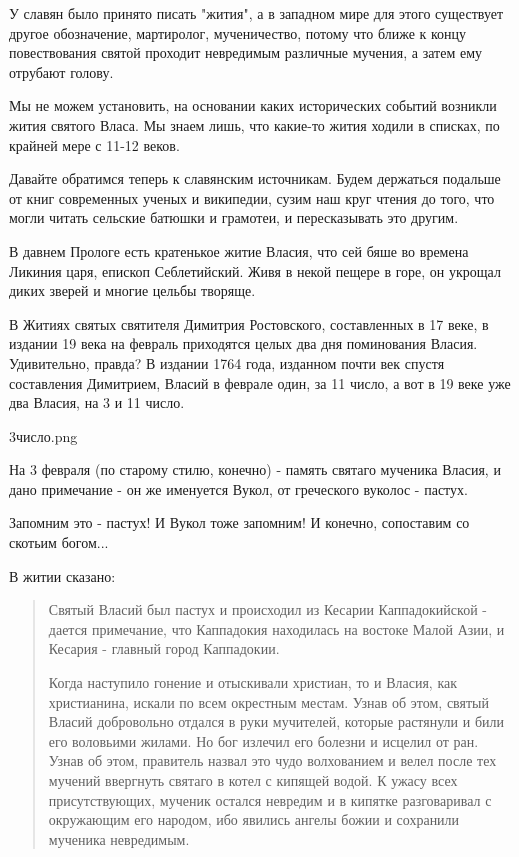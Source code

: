 \documentclass[a5paper,11pt,openany]{article}
\begin{document}
   У славян было принято писать "жития", а в западном мире для этого существует другое обозначение, мартиролог, мученичество, потому что ближе к концу повествования святой проходит невредимым различные мучения, а затем ему отрубают голову.   

    Мы не можем установить, на основании каких исторических событий возникли жития святого Власа. Мы знаем лишь, что какие-то жития ходили в списках, по крайней мере с 11-12 веков.

   Давайте обратимся теперь к славянским источникам. Будем держаться подальше от книг современных ученых и википедии, сузим наш круг чтения до того, что могли читать сельские батюшки и грамотеи, и пересказывать это другим.

   В давнем Прологе есть кратенькое житие Власия, что сей бяше во времена Ликиния царя, епископ Себлетийский. Живя в некой пещере в горе, он укрощал диких зверей и многие цельбы творяще.

   В Житиях святых святителя Димитрия Ростовского, составленных в 17 веке, в издании 19 века на февраль приходятся целых два дня поминования Власия. Удивительно, правда? В издании 1764 года, изданном почти век спустя составления Димитрием, Власий в феврале один, за 11 число, а вот в 19 веке уже два Власия, на 3 и 11 число.

3число.png

   На 3 февраля (по старому стилю, конечно) - память святаго мученика Власия, и дано примечание - он же именуется Вукол, от греческого вуколос - пастух.

   Запомним это - пастух! И Вукол тоже запомним! И конечно, сопоставим со скотьим богом...

   В житии сказано:

\begin{quotation}
\noindent Святый Власий был пастух и происходил из Кесарии Каппадокийской - дается примечание, что Каппадокия находилась на востоке Малой Азии, и Кесария - главный город Каппадокии.

   Когда наступило гонение и отыскивали христиан, то и Власия, как христианина, искали по всем окрестным местам. Узнав об этом, святый Власий добровольно отдался в руки мучителей, которые растянули и били его воловьими жилами. Но бог излечил его болезни и исцелил от ран. Узнав об этом, правитель назвал это чудо волхованием и велел после тех мучений ввергнуть святаго в котел с кипящей водой. К ужасу всех присутствующих, мученик остался невредим и в кипятке разговаривал с окружающим его народом, ибо явились ангелы божии и сохранили мученика невредимым.\end{quotation} 
\end{document}
